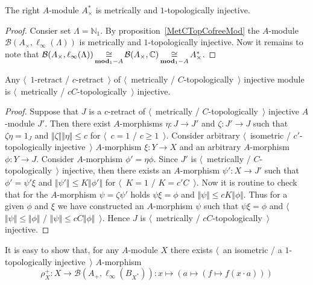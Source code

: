 \begin{proposition}\label{DualOfUnitalAlgIsMetTopInj} The right $A$-module
$A_\times^*$ is metrically and $1$-topologically injective.
\end{proposition}
\begin{proof} Consier set $\Lambda=\mathbb{N}_1$. 
By proposition~\ref{MetCTopCofreeMod} the 
$A$-module $\mathcal{B}(A_\times, \ell_\infty(\Lambda))$ is metrically 
and $1$-topologically injective. Now it remains to note that 
$\mathcal{B}(A_\times, \ell_\infty(\Lambda))
\mathop{\mathbin{\cong}}\limits_{\mathbf{mod}_1-A}\\
\mathcal{B}(A_\times, \mathbb{C})
\mathop{\mathbin{\cong}}\limits_{\mathbf{mod}_1-A}
A_\times^*$.
\end{proof}

\begin{proposition}\label{RetrMetCTopInjIsMetCTopInj} Any 
$\langle$~$1$-retract / $c$-retract~$\rangle$ of
$\langle$~metrically / $C$-topologically~$\rangle$ injective module is
$\langle$~metrically / $c C$-topologically~$\rangle$ injective.
\end{proposition}
\begin{proof} Suppose that $J$ is a $c$-retract of 
$\langle$~metrically / $C$-topologically~$\rangle$ injective $A$-module $J'$.
Then there exist $A$-morphisms $\eta:J\to J'$ and $\zeta: J'\to J$ such that
$\zeta\eta=1_{J}$ and $\Vert\zeta\Vert\Vert\eta\Vert\leq c$ 
for $\langle$~$c=1$ / $c\geq 1$~$\rangle$. Consider 
arbitrary $\langle$~isometric / $c'$-topologically injective~$\rangle$ 
$A$-morphism $\xi:Y\to X$ and an arbitrary $A$-morphism $\phi:Y\to J$. 
Consider $A$-morphism $\phi'=\eta\phi$. Since $J'$ is 
$\langle$~metrically / $C$-topologically~$\rangle$ injective, then there 
exists an $A$-morphism $\psi':X\to J'$ such that $\phi'=\psi'\xi$ 
and $\Vert\psi'\Vert \leq K\Vert\phi'\Vert$ 
for $\langle$~$K=1$ / $K=c' C$~$\rangle$. Now it is routine to check that 
for the $A$-morphism $\psi=\zeta\psi'$ 
holds $\psi\xi=\phi$ and $\Vert\psi\Vert \leq cK\Vert\phi\Vert$. 
Thus for a given $\phi$ and $\xi$ we have
constructed an $A$-morphism $\psi$ such that $\psi\xi=\phi$  and
$\langle$~$\Vert\psi\Vert\leq\Vert\phi\Vert$ / 
$\Vert \psi\Vert\leq c C\Vert\phi\Vert$~$\rangle$. Hence $J$ 
is $\langle$~metrically / $c C$-topologically~$\rangle$ injective.
\end{proof}


It is easy to show that, for any $A$-module $X$ there exists 
$\langle$~an isometric / a $1$-topologically injective~$\rangle$ 
$A$-morphism
$$
\rho_X^+
:X\to\mathcal{B}(A_+, \ell_\infty(B_{X^*}))
:x\mapsto(a\mapsto(f\mapsto f(x\cdot a)))
$$


